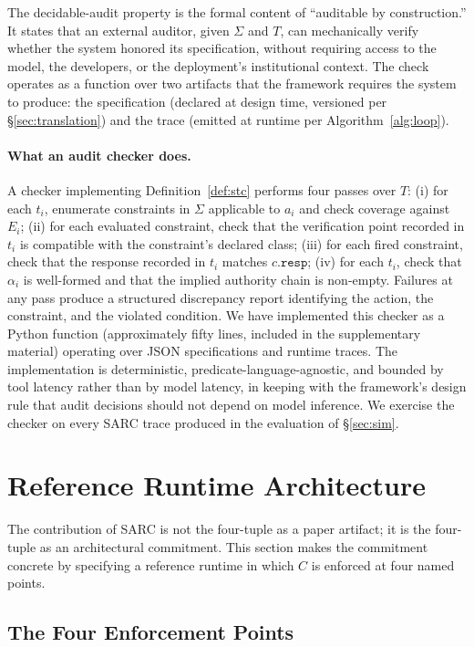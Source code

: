 \documentclass[11pt,a4paper]{article}
\theoremstyle{remark}
\begin{document}
The decidable-audit property is the formal content of ``auditable by construction.'' It states that an external auditor, given $\Sigma$ and $T$, can mechanically verify whether the system honored its specification, without requiring access to the model, the developers, or the deployment's institutional context. The check operates as a function over two artifacts that the framework requires the system to produce: the specification (declared at design time, versioned per \S\ref{sec:translation}) and the trace (emitted at runtime per Algorithm~\ref{alg:loop}).

\paragraph{What an audit checker does.} A checker implementing Definition~\ref{def:stc} performs four passes over $T$: (i) for each $t_i$, enumerate constraints in $\Sigma$ applicable to $a_i$ and check coverage against $E_i$; (ii) for each evaluated constraint, check that the verification point recorded in $t_i$ is compatible with the constraint's declared class; (iii) for each fired constraint, check that the response recorded in $t_i$ matches $c.\texttt{resp}$; (iv) for each $t_i$, check that $\alpha_i$ is well-formed and that the implied authority chain is non-empty. Failures at any pass produce a structured discrepancy report identifying the action, the constraint, and the violated condition. We have implemented this checker as a Python function (approximately fifty lines, included in the supplementary material) operating over JSON specifications and runtime traces. The implementation is deterministic, predicate-language-agnostic, and bounded by tool latency rather than by model latency, in keeping with the framework's design rule that audit decisions should not depend on model inference. We exercise the checker on every SARC trace produced in the evaluation of \S\ref{sec:sim}.

\section{Reference Runtime Architecture}\label{sec:arch}

The contribution of SARC is not the four-tuple as a paper artifact; it is the four-tuple as an architectural commitment. This section makes the commitment concrete by specifying a reference runtime in which $C$ is enforced at four named points.

\subsection{The Four Enforcement Points}
\end{document}
